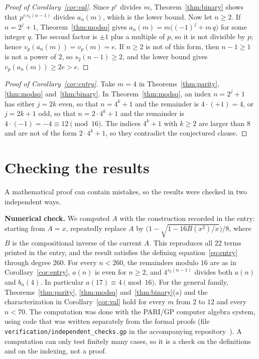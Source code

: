 \documentclass[11pt,a4paper]{article}
\theoremstyle{definition}
\theoremstyle{remark}
\newcommand{\para}[1]{\par\medskip\noindent\textbf{#1}\enspace}
\begin{document}
\begin{proof}[Proof of Corollary~\ref{cor:val}]
Since $p^{e}$ divides $m$, Theorem~\ref{thm:binary} shows that $p^{e\,s_2(n-1)}$ divides $a_n(m)$, which is the lower
bound. Now let $n\ge2$. If $n=2^j+1$, Theorem~\ref{thm:modsq} gives $a_n(m)=m\bigl((-1)^j+m\,q\bigr)$ for some integer
$q$. The second factor is $\pm1$ plus a multiple of $p$, so it is not divisible by $p$; hence $v_p(a_n(m))=v_p(m)=e$.
If $n\ge2$ is not of this form, then $n-1\ge1$ is not a power of $2$, so $s_2(n-1)\ge2$, and the lower bound gives
$v_p(a_n(m))\ge2e>e$.
\end{proof}

\begin{proof}[Proof of Corollary~\ref{cor:entry}]
Take $m=4$ in Theorems~\ref{thm:parity}, \ref{thm:modsq} and~\ref{thm:binary}. In Theorem~\ref{thm:modsq}, an index
$n=2^j+1$ has either $j=2k$ even, so that $n=4^k+1$ and the remainder is $4\cdot(+1)=4$, or $j=2k+1$ odd, so that
$n=2\cdot4^k+1$ and the remainder is $4\cdot(-1)=-4\equiv12\pmod{16}$. The indices $4^k+1$ with $k\ge2$ are larger than
$8$ and are not of the form $2\cdot4^k+1$, so they contradict the conjectured clause.
\end{proof}

\section{Checking the results}\label{sec:checks}

A mathematical proof can contain mistakes, so the results were checked in two independent ways.

\para{Numerical check.}
We computed $A$ with the construction recorded in the entry: starting from $A=x$, repeatedly replace $A$
by $\bigl(1-\sqrt{1-16B(x^2)/x}\bigr)/8$, where $B$ is the compositional inverse of the current $A$. This reproduces all
22 terms printed in the entry, and the result satisfies the defining equation~\eqref{eq:entry} through degree $260$.
For every $n<260$, the remainders modulo $16$ are as in Corollary~\ref{cor:entry}, $a(n)$ is even for $n\ge2$, and
$4^{s_2(n-1)}$ divides both $a(n)$ and $b_n(4)$. In particular $a(17)\equiv4\pmod{16}$. For the general family,
Theorems~\ref{thm:parity}, \ref{thm:modsq} and~\ref{thm:binary}(a) and the characterization in
Corollary~\ref{cor:val} hold for every $m$ from $2$ to $12$ and every $n<70$.
The computation was done with the PARI/GP computer algebra system, using code that was written separately from the
formal proofs (file \texttt{verification/independent\_checks.gp} in the accompanying repository~\cite{repo}).
A computation can only test finitely many cases, so it is a check on the definitions and on the indexing, not a proof.
\end{document}
